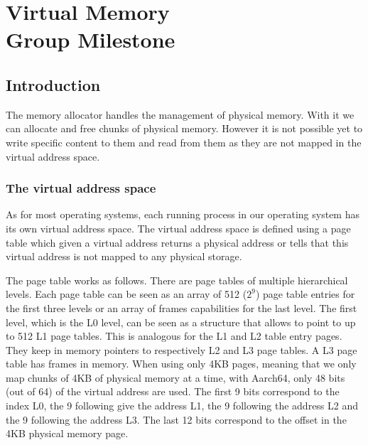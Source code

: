 \chapter[Virtual Memory]{Virtual Memory \\ \Large \textnormal{Group Milestone}}

\section{Introduction}

The memory allocator handles the management of physical memory. With it we can allocate and free chunks of physical memory. However it is not possible yet to write specific content to them and read from them as they are not mapped in the virtual address space.

\subsection{The virtual address space}

As for most operating systems, each running process in our operating system has its own virtual address space. The virtual address space is defined using a page table which given a virtual address returns a physical address or tells that this virtual address is not mapped to any physical storage.

\medskip

The page table works as follows. There are page tables of multiple hierarchical levels. Each page table can be seen as an array of 512 ($2^9$) page table entries for the first three levels or an array of frames capabilities for the last level. The first level, which is the L0 level, can be seen as a structure that allows to point to up to 512 L1 page tables. This is analogous for the L1 and L2 table entry pages. They keep in memory pointers to respectively L2 and L3 page tables. A L3 page table has frames in memory.
\medskip
When using only 4KB pages, meaning that we only map chunks of 4KB of physical memory at a time, with Aarch64, only 48 bits (out of 64) of the virtual address are used. 
The first 9 bits correspond to the index L0, the 9 following give the address L1, the 9 following the address L2 and the 9 following the address L3. The last 12 bits correspond to the offset in the 4KB physical memory page.


